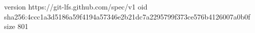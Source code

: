 version https://git-lfs.github.com/spec/v1
oid sha256:4ccc1a3d5186a59f4194a57346e2b21dc7a2295799f373ce576b4126007a0b0f
size 801
